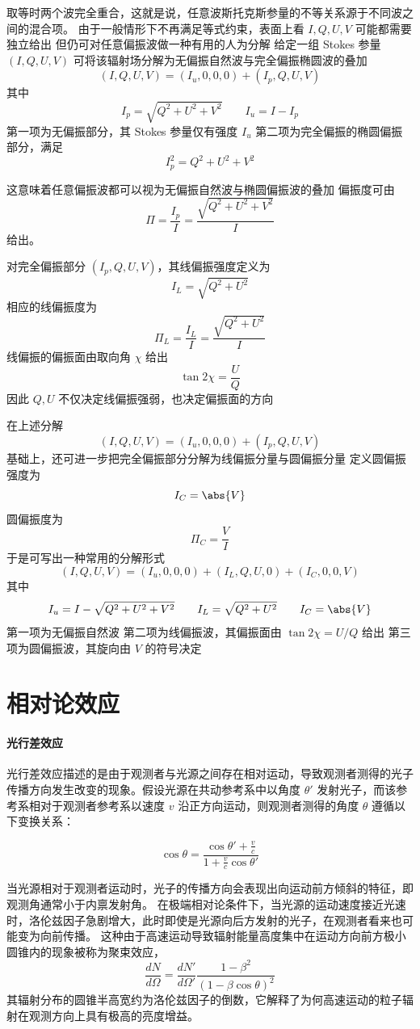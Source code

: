 取等时两个波完全重合，这就是说，任意波斯托克斯参量的不等关系源于不同波之间的混合项。
由于一般情形下不再满足等式约束，表面上看 $I,Q,U,V$ 可能都需要独立给出  
但仍可对任意偏振波做一种有用的人为分解
给定一组 Stokes 参量 $(I,Q,U,V)$  
可将该辐射场分解为无偏振自然波与完全偏振椭圆波的叠加
\[
(I,Q,U,V)=(I_u,0,0,0)+(I_p,Q,U,V)
\]
其中
\[
I_p=\sqrt{Q^2+U^2+V^2}
\qquad
I_u=I-I_p
\]
第一项为无偏振部分，其 Stokes 参量仅有强度 $I_u$  
第二项为完全偏振的椭圆偏振部分，满足
\[
I_p^2=Q^2+U^2+V^2
\]

这意味着任意偏振波都可以视为无偏振自然波与椭圆偏振波的叠加  
偏振度可由
\[
\Pi=\frac{I_p}{I}=\frac{\sqrt{Q^2+U^2+V^2}}{I}
\]
给出。

对完全偏振部分 $(I_p,Q,U,V)$，其线偏振强度定义为
\[
I_L=\sqrt{Q^2+U^2}
\]
相应的线偏振度为
\[
\Pi_L=\frac{I_L}{I}=\frac{\sqrt{Q^2+U^2}}{I}
\]
线偏振的偏振面由取向角 $\chi$ 给出
\[
\tan 2\chi=\frac{U}{Q}
\]
因此 $Q,U$ 不仅决定线偏振强弱，也决定偏振面的方向


在上述分解
\[
(I,Q,U,V)=(I_u,0,0,0)+(I_p,Q,U,V)
\]
基础上，还可进一步把完全偏振部分分解为线偏振分量与圆偏振分量  
定义圆偏振强度为
\[
I_C=\abs{V}
\]
圆偏振度为
\[
\Pi_C=\frac{V}{I}
\]
于是可写出一种常用的分解形式
\[
(I,Q,U,V)=(I_u,0,0,0)+(I_L,Q,U,0)+(I_C,0,0,V)
\]
其中
\[
I_u=I-\sqrt{Q^2+U^2+V^2}
\qquad
I_L=\sqrt{Q^2+U^2}
\qquad
I_C=\abs{V}
\]
第一项为无偏振自然波  
第二项为线偏振波，其偏振面由 $\tan 2\chi=U/Q$ 给出  
第三项为圆偏振波，其旋向由 $V$ 的符号决定

\section{相对论效应}
\paragraph{光行差效应}
光行差效应描述的是由于观测者与光源之间存在相对运动，导致观测者测得的光子传播方向发生改变的现象。假设光源在共动参考系中以角度 $\theta'$ 发射光子，而该参考系相对于观测者参考系以速度 $v$ 沿正方向运动，则观测者测得的角度 $\theta$ 遵循以下变换关系：

\begin{equation}
\cos \theta = \frac{\cos \theta' + \frac{v}{c}}{1 + \frac{v}{c} \cos \theta'}
\end{equation}

当光源相对于观测者运动时，光子的传播方向会表现出向运动前方倾斜的特征，即观测角通常小于内禀发射角。
在极端相对论条件下，当光源的运动速度接近光速时，洛伦兹因子急剧增大，此时即使是光源向后方发射的光子，在观测者看来也可能变为向前传播。
这种由于高速运动导致辐射能量高度集中在运动方向前方极小圆锥内的现象被称为聚束效应，
$$\frac{dN}{d\Omega} = \frac{dN'}{d\Omega'} \frac{1-\beta^2}{(1-\beta \cos \theta)^2}$$
其辐射分布的圆锥半高宽约为洛伦兹因子的倒数，它解释了为何高速运动的粒子辐射在观测方向上具有极高的亮度增益。

